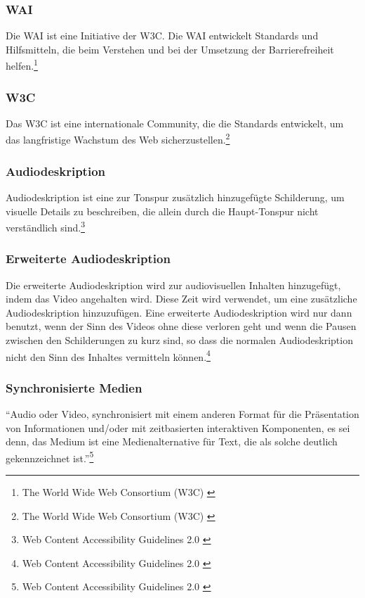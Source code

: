 \subsubsection{\ac{WAI}}
Die \ac{WAI} ist eine Initiative der \ac{W3C}. Die \ac{WAI} entwickelt Standards und Hilfsmitteln, die beim Verstehen und bei der Umsetzung 
der Barrierefreiheit helfen.\footnote{The World Wide Web Consortium (W3C) \cite{w3c}}

\subsubsection{\ac{W3C}}
Das \ac{W3C} ist eine internationale Community, die die Standards entwickelt, um das langfristige Wachstum des Web 
sicherzustellen.\footnote{The World Wide Web Consortium (W3C) \cite{w3c}}

\subsubsection{Audiodeskription}
Audiodeskription ist eine zur Tonspur zusätzlich hinzugefügte Schilderung, um visuelle Details zu beschreiben, die allein durch die Haupt-Tonspur 
nicht verständlich sind.\footnote{Web Content Accessibility Guidelines 2.0 \cite{WCAG2.0}}

\subsubsection{Erweiterte Audiodeskription}
Die erweiterte Audiodeskription wird zur audiovisuellen Inhalten hinzugefügt, indem das Video angehalten wird. Diese Zeit wird verwendet, 
um eine zusätzliche Audiodeskription hinzuzufügen. Eine erweiterte Audiodeskription wird nur dann benutzt, wenn der Sinn des Videos ohne diese verloren geht und wenn 
die Pausen zwischen den Schilderungen zu kurz sind, so dass die normalen Audiodeskription nicht den Sinn des Inhaltes vermitteln 
können.\footnote{Web Content Accessibility Guidelines 2.0 \cite{WCAG2.0}}

\subsubsection{Synchronisierte Medien}
"`Audio oder Video, synchronisiert mit einem anderen Format für die Präsentation von Informationen und/oder mit zeitbasierten interaktiven 
Komponenten, es sei denn, das Medium ist eine Medienalternative für Text, die als solche deutlich gekennzeichnet 
ist."'\footnote{Web Content Accessibility Guidelines 2.0 \cite{WCAG2.0}}

